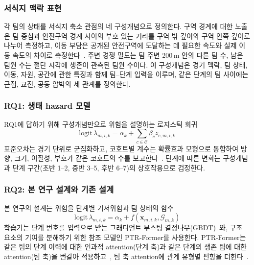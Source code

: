\subsubsection{서식지 맥락 표현}
\label{sec:method:representation}
각 팀의 상태를 서식지 축소 관점의 네 구성개념으로 정의한다.
구역 경계에 대한 노출은 팀 중심과 안전구역 경계 사이의 부호 있는 거리를 구역 밖 깊이와 구역 안쪽 깊이로 나누어 측정하고, 이동 부담은 공개된 안전구역에 도달하는 데 필요한 속도와 실제 이동 속도의 차이로 측정한다~\cite{Nathan08}.
주변 경쟁 밀도는 팀 주변 200\,m 안의 다른 팀 수, 남은 팀원 수는 절단 시각에 생존이 관측된 팀원 수이다.
이 구성개념은 경기 맥락, 팀 상태, 이동, 자원, 공간에 관한 특징과 함께 팀--단계 입력을 이루며, 같은 단계의 팀 사이에는 근접, 교전, 공동 압박의 세 관계를 정의한다.

\subsubsection{RQ1: 생태 hazard 모델}
\label{sec:method:rq1}
RQ1에 답하기 위해 구성개념만으로 위험을 설명하는 로지스틱 회귀
\begin{equation}
\mathrm{logit}\,\lambda_{m,i,k}=\alpha_k+\textstyle\sum_{c\in\mathcal{C}}\beta_c z_{c,m,i,k}
\label{eq:ehm}
\end{equation}
표준오차는 경기 단위로 군집화하고, 코호트별 계수는 확률효과 모형으로 통합하여 방향, 크기, 이질성, 부호가 같은 코호트의 수를 보고한다~\cite{DerSimonian86}.
단계에 따른 변화는 구성개념과 단계 구간(초반 1--2, 중반 3--5, 후반 6--7)의 상호작용으로 검정한다.

\subsubsection{RQ2: 본 연구 설계와 기존 설계}
\label{sec:method:rq2}
본 연구의 설계는 위험을 단계별 기저위험과 팀 상태의 함수
\begin{equation}
\mathrm{logit}\,\lambda_{m,i,k}=\alpha_k+f(\mathbf{x}_{m,i,k},\mathcal{G}_{m,k})
\label{eq:logit}
\end{equation}
학습기는 단계 번호를 입력으로 받는 그래디언트 부스팅 결정나무(GBDT)~\cite{Friedman01,Ke17}와, 구조 요소의 기여를 분해하기 위한 참조 모델인 PTR-Former를 사용한다.
PTR-Former는 같은 팀의 단계 이력에 대한 인과적 attention(단계 축)과 같은 단계의 생존 팀에 대한 attention(팀 축)을 번갈아 적용하고~\cite{Vaswani17}, 팀 축 attention에 관계 유형별 편향을 더한다~\cite{Ying21}.

